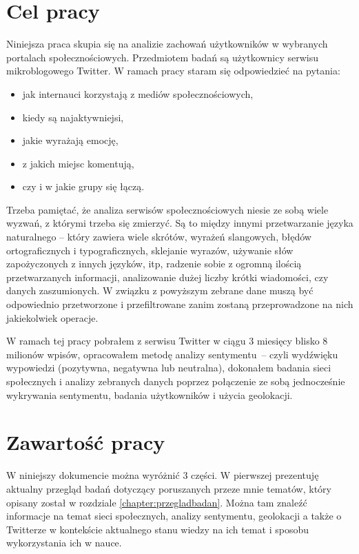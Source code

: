 \section{Cel pracy}
Niniejsza praca skupia się na analizie zachowań użytkowników w wybranych
portalach społecznościowych. Przedmiotem badań są użytkownicy serwisu
mikroblogowego Twitter. W ramach pracy staram się odpowiedzieć na pytania:
\begin{itemize}
  \item jak internauci korzystają z mediów społecznościowych,
  \item kiedy są najaktywniejsi,
  \item jakie wyrażają emocję,
  \item z jakich miejsc komentują,
  \item czy i w jakie grupy się łączą.
\end{itemize}

Trzeba pamiętać, że analiza serwisów społecznościowych niesie ze sobą wiele 
wyzwań, z którymi trzeba się zmierzyć. Są to między innymi przetwarzanie
języka naturalnego -- który zawiera wiele skrótów, wyrażeń slangowych, błędów
ortograficznych i typograficznych, sklejanie wyrazów, używanie słów zapożyczonych
z innych języków, itp, radzenie sobie z ogromną ilością przetwarzanych informacji,
analizowanie dużej liczby krótki wiadomości, czy danych zaszumionych.
W związku z powyższym zebrane dane muszą być odpowiednio przetworzone i przefiltrowane
zanim zostaną przeprowadzone na nich jakiekolwiek operacje.

W ramach tej pracy pobrałem z serwisu Twitter w ciągu 3 miesięcy blisko 8
milionów wpisów, opracowałem metodę analizy sentymentu~-- czyli wydźwięku
wypowiedzi (pozytywna, negatywna lub neutralna), dokonałem badania sieci
społecznych i analizy zebranych danych poprzez połączenie ze sobą jednocześnie
wykrywania sentymentu, badania użytkowników i użycia geolokacji.

\section{Zawartość pracy}
W niniejszy dokumencie można wyróżnić 3 części. W pierwszej prezentuję
aktualny przegląd badań dotyczący poruszanych przeze mnie tematów, który
opisany został w rozdziale \ref{chapter:przegladbadan}. Można tam znaleźć
informacje na temat sieci społecznych, analizy sentymentu, geolokacji
a także o Twitterze w kontekście aktualnego stanu wiedzy na ich temat i sposobu
wykorzystania ich w nauce.

